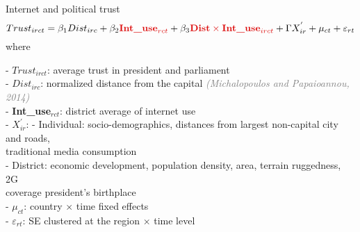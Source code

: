 \documentclass[aspectratio=169,xcolor=dvipsnames]{beamer}
\begin{document}
\begin{frame}{Internet and political trust}
\begin{equation}
    \fontsize{10}{11}\selectfont
    Trust_{irct} = \beta_{1} Dist_{irc} + \beta_{2} \textcolor[RGB]{220, 10, 10}{\textbf{Int\_use}_{rct}} + \beta_{3} \textcolor[RGB]{220, 10, 10}{\textbf{Dist} \times \textbf{Int\_use}_{irct}} + \Gamma X^{'}_{ir} + \mu_{ct}+ \varepsilon_{rt}
    \end{equation}
\vfill
\hspace{1em}
where\\
\vfill
    {\fontsize{10}{11}\selectfont
\begin{flushleft}
 \hspace{2.5em}
    - $Trust_{irct}$: average trust in president and parliament\\
    \vfill
\hspace{2.5em}
    - $Dist_{irc}$: normalized distance from the capital \textcolor{gray}{\textit{(Michalopoulos and Papaioannou, 2014)}}\\
    \vfill
 \hspace{2.5em}
   - \textcolor[RGB]{220, 10, 10}{\textbf{Int\_use}$_{rct}$:} district average of internet use\\
    \vfill
 \hspace{2.5em}
   - $X^{'}_{ir}$:
- Individual: socio-demographics, distances from largest non-capital city and roads, \\
\hspace{5.7em} traditional media consumption\\
\vfill
\hspace{5em}
- District: economic development, population density, area, terrain ruggedness, 2G \\
\hspace{5.7em} coverage president's birthplace\\    \vfill
\hspace{2.5em}
    - $\mu_{ct}$: country $\times$ time fixed effects\\ \vfill
\hspace{2.5em}
    - $\varepsilon_{rt}$: SE clustered at the region $\times$ time level



\end{flushleft}
    }
\end{frame}
\end{document}
